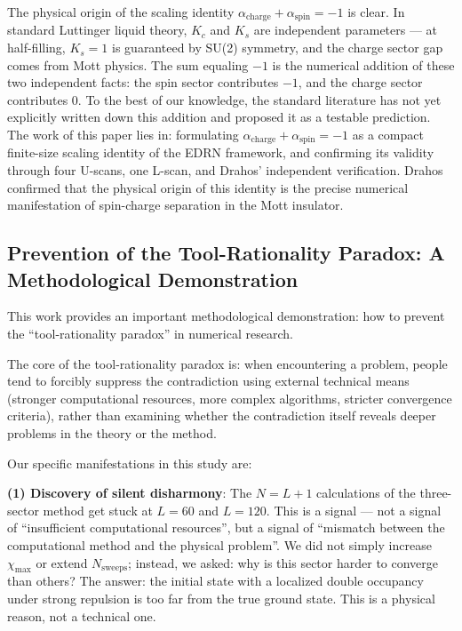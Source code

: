 \documentclass[prb,reprint,twocolumn,superscriptaddress]{revtex4-2}
\begin{document}
The physical origin of the scaling identity $\alpha_{\mathrm{charge}} + \alpha_{\mathrm{spin}} = -1$ is clear. In standard Luttinger liquid theory, $K_c$ and $K_s$ are independent parameters --- at half-filling, $K_s = 1$ is guaranteed by SU(2) symmetry, and the charge sector gap comes from Mott physics. The sum equaling $-1$ is the numerical addition of these two independent facts: the spin sector contributes $-1$, and the charge sector contributes $0$. To the best of our knowledge, the standard literature has not yet explicitly written down this addition and proposed it as a testable prediction. The work of this paper lies in: formulating $\alpha_{\mathrm{charge}} + \alpha_{\mathrm{spin}} = -1$ as a compact finite-size scaling identity of the EDRN framework, and confirming its validity through four U-scans, one L-scan, and Drahos' independent verification. Drahos confirmed that the physical origin of this identity is the precise numerical manifestation of spin-charge separation in the Mott insulator.

\subsection{Prevention of the Tool-Rationality Paradox: A Methodological Demonstration}

This work provides an important methodological demonstration: how to prevent the ``tool-rationality paradox'' in numerical research.

The core of the tool-rationality paradox is: when encountering a problem, people tend to forcibly suppress the contradiction using external technical means (stronger computational resources, more complex algorithms, stricter convergence criteria), rather than examining whether the contradiction itself reveals deeper problems in the theory or the method.

Our specific manifestations in this study are:

\textbf{(1) Discovery of silent disharmony}: The $N = L+1$ calculations of the three-sector method get stuck at $L = 60$ and $L = 120$. This is a signal --- not a signal of ``insufficient computational resources'', but a signal of ``mismatch between the computational method and the physical problem''. We did not simply increase $\chi_{\max}$ or extend $N_{\text{sweeps}}$; instead, we asked: why is this sector harder to converge than others? The answer: the initial state with a localized double occupancy under strong repulsion is too far from the true ground state. This is a physical reason, not a technical one.
\end{document}
